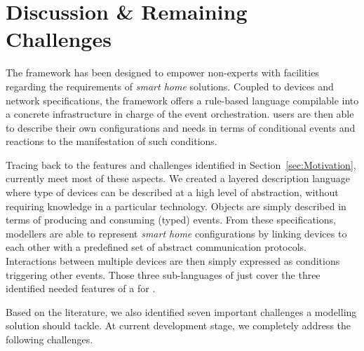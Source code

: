 \section{Discussion \& Remaining Challenges}
\label{sec:ChallengeDiscussion}

The \IOTDSL framework has been designed to empower non-experts with facilities regarding the requirements of \textit{smart home} \IOT solutions. Coupled to \IOT devices and network specifications, the framework offers a rule-based language compilable into a concrete \CEP infrastructure in charge of the event orchestration. \IOTDSL users are then able to describe their own configurations and needs in terms of conditional events and reactions to the manifestation of such conditions.

Tracing back to the features and challenges identified in Section~\ref{sec:Motivation}, \IOTDSL currently meet most of these aspects. We created a layered description language where type of devices can be described at a high level of abstraction, without requiring knowledge in a particular technology. Objects are simply described in terms of producing and consuming (typed) events. From these specifications, modellers are able to represent \textit{smart home} configurations by linking devices to each other with a predefined set of abstract communication protocols. Interactions between multiple devices are then simply  expressed as conditions triggering other events. Those three sub-languages of \IOTDSL just cover the three identified needed features of a \DSL for \IOT.

Based on the literature, we also identified seven important challenges a \IOT modelling solution should tackle. At current development stage, we completely address the following challenges.

